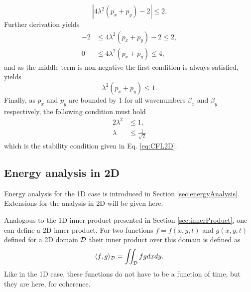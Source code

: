 \begin{equation*}
    \left|4\lambda^2(p_x + p_y)-2\right| \leq 2.
\end{equation*}
Further derivation yields
\begin{align*}
    -2 &\leq 4\lambda^2(p_x + p_y)-2 \leq 2, \\
    0 &\leq 4\lambda^2(p_x + p_y) \leq 4,
\end{align*} 
and as the middle term is non-negative the first condition is always satisfied, yields
\begin{equation*}
    \lambda^2(p_x + p_y) \leq 1.
\end{equation*}
Finally, as $p_x$ and $p_y$ are bounded by 1 for all wavenumbers $\beta_x$ and $\beta_y$ respectively, the following condition must hold
\begin{align}
    2\lambda^2&\leq 1,\nonumber\\
    \lambda &\leq \frac{1}{\sqrt{2}}
\end{align}
which is the stability condition given in Eq. \eqref{eq:CFL2D}.

\subsection{Energy analysis in 2D}\label{sec:energyAnalysis2DWave}
\def\domXred{\underline{d_x}}
\def\domYred{\underline{d_y}}
\def\domXredBoth{\underline{\overline{d_x}}}
\def\domYredBoth{\underline{\overline{d_y}}}
\def\domRedBoth{\underline{\overline{d}}}

Energy analysis for the 1D case is introduced in Section \ref{sec:energyAnalysis}. Extensions for the analysis in 2D will be given here.

Analogous to the 1D inner product presented in Section \ref{sec:innerProduct}, one can define a 2D inner product. For two functions $f = f(x,y,t)$ and $g(x,y,t)$ defined for a 2D domain $\mathcal{D}$ their inner product over this domain is defined as
\begin{equation}
    \langle f, g \rangle_{\mathcal{D}}  = \iint_{\mathcal{D}} f g dx dy.
\end{equation}
Like in the 1D case, these functions do not have to be a function of time, but they are here, for coherence. 

